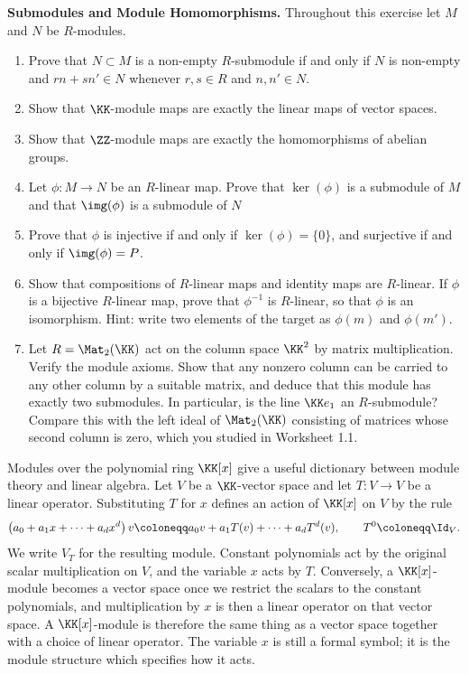 \documentclass[12pt,reqno]{amsart}
\begin{document}
\begin{problems}
\item\label{m:maps} \textbf{Submodules and Module Homomorphisms.} Throughout this exercise let $M$ and $N$ be $R$-modules.
\begin{enumerate}
\item Prove that $N \subset M$ is a non-empty $R$-submodule if and only if $N$ is non-empty and $rn+sn'\in N$ whenever $r,s\in R$ and $n,n'\in N$. 
\item Show that $\KK$-module maps are exactly the linear maps of vector spaces.
\item Show that $\ZZ$-module maps are exactly the homomorphisms of abelian groups.
\item Let $\phi:M\to N$ be an $R$-linear map. Prove that $\ker(\phi)$ is a submodule of $M$ and that $\img(\phi)$ is a submodule of $N$
\item  Prove that $\phi$ is injective if and only if $\ker(\phi)=\{0\}$, and surjective if and only if $\img(\phi)=P$.
\item Show that compositions of $R$-linear maps and identity maps are $R$-linear. If $\phi$ is a bijective $R$-linear map, prove that $\phi^{-1}$ is $R$-linear, so that $\phi$ is an isomorphism. Hint: write two elements of the target as $\phi(m)$ and $\phi(m')$.
\item Let $R=\Mat_2(\KK)$ act on the column space $\KK^2$ by matrix multiplication. Verify the module axioms. Show that any nonzero column can be carried to any other column by a suitable matrix, and deduce that this module has exactly two submodules. In particular, is the line $\KK e_1$ an $R$-submodule? Compare this with the left ideal of $\Mat_2(\KK)$ consisting of matrices whose second column is zero, which you studied in Worksheet 1.1.
\end{enumerate}
\end{problems}

\hrulefill


Modules over the polynomial ring $\KK[x]$ give a useful dictionary between module theory and linear algebra. Let $V$ be a $\KK$-vector space and let $T:V\to V$ be a linear operator. Substituting $T$ for $x$ defines an action of $\KK[x]$ on $V$ by the rule
\[
 \left(a_0+a_1x+\cdots+a_dx^d\right)v
 \coloneqq a_0v+a_1T(v)+\cdots+a_dT^d(v),\qquad T^0\coloneqq\Id_V.
\]
We write $V_T$ for the resulting module. Constant polynomials act by the original scalar multiplication on $V$, and the variable $x$ acts by $T$. Conversely, a $\KK[x]$-module becomes a vector space once we restrict the scalars to the constant polynomials, and multiplication by $x$ is then a linear operator on that vector space. A $\KK[x]$-module is therefore the same thing as a vector space together with a choice of linear operator. The variable $x$ is still a formal symbol; it is the module structure which specifies how it acts.
\end{document}
